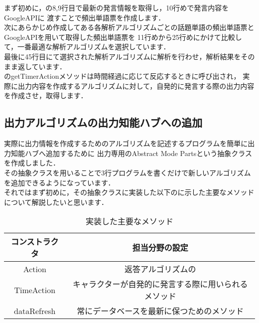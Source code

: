 
まず初めに，の8,9行目で最新の発言情報を取得し，10行めで発言内容をGoogleAPIに
渡すことで頻出単語票を作成します．
\\
次にあらかじめ作成してある各解析アルゴリズムごとの話題単語の頻出単語票とGoogleAPIを用いて取得した頻出単語票を
11行めから25行めにかけて比較して，一番最適な解析アルゴリズムを選択しています．
\\
最後に45行目にて選択された解析アルゴリズムに解析を行わせ，解析結果をそのまま返しています．\\


のgetTimerActionメソッドは時間経過に応じて反応するときに呼び出され，
実際に出力内容を作成するアルゴリズムに対して，自発的に発言する際の出力内容を作成させ，取得します．\\



\subsection{出力アルゴリズムの出力知能ハブへの追加}
実際に出力情報を作成するためのアルゴリズムを記述するプログラムを簡単に出力知能ハブへ追加するために
出力専用のAbstract Mode Partsという抽象クラスを作成しました．\\

その抽象クラスを用いることで3行プログラムを書くだけで新しいアルゴリズムを追加できるようになっています．\\

それではまず初めに，その抽象クラスに実装した以下のに示した主要なメソッドについて解説したいと思います．\\

\begin{table}[tbh]
	\caption{実装した主要なメソッド} \label{tab:parts}
	\begin{center}
		\begin{tabular}[htb]{c|c}
		\hline
		コンストラクタ & 担当分野の設定 \\
		\hline
		Action & 返答アルゴリズムの \\
		\hline
		TimeAction & キャラクターが自発的に発言する際に用いられるメソッド \\
		\hline
		dataRefresh & 常にデータベースを最新に保つためのメソッド \\
		\hline
		\end{tabular}
	\end{center}
\end{table}

